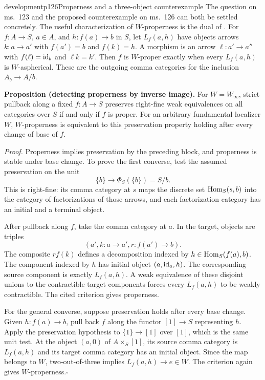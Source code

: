 \begin{dcomment}{development}{p126}{Properness and a three-object counterexample}
The question on ms.~123 and the proposed counterexample on ms.~126 can both be settled concretely. The useful characterization of $W$-properness is the dual of \citet[Theorem~1.2(b)]{Maltsiniotis2005Asphericite}. For $f:A\to S$, $a\in A$, and $h:f(a)\to b$ in $S$, let $L_f(a,h)$ have objects arrows $k:a\to a'$ with $f(a')=b$ and $f(k)=h$. A morphism is an arrow $\ell:a'\to a''$ with $f(\ell)=\mathrm{id}_b$ and $\ell k=k'$. Then $f$ is $W$-proper exactly when every $L_f(a,h)$ is $W$-aspherical. These are the outgoing comma categories for the inclusion $A_b\to A/b$.

\textbf{Proposition (detecting properness by inverse image).}\ours
For $W=W_\infty$, strict pullback along a fixed $f:A\to S$ preserves right-fine weak equivalences on all categories over $S$ if and only if $f$ is proper. For an arbitrary fundamental localizer $W$, $W$-properness is equivalent to this preservation property holding after every change of base of $f$.

\textit{Proof.} Properness implies preservation by the preceding block, and properness is stable under base change. To prove the first converse, test the assumed preservation on the unit
\[
 \{b\}\longrightarrow\Phi_S(\{b\})=S/b.
\]
This is right-fine: its comma category at $s$ maps the discrete set $\operatorname{Hom}_S(s,b)$ into the category of factorizations of those arrows, and each factorization category has an initial and a terminal object.

After pullback along $f$, take the comma category at $a$. In the target, objects are triples
\[
 (a',k:a\to a',r:f(a')\to b).
\]
The composite $r f(k)$ defines a decomposition indexed by $h\in\operatorname{Hom}_S(f(a),b)$. The component indexed by $h$ has initial object $(a,\mathrm{id}_a,h)$. The corresponding source component is exactly $L_f(a,h)$. A weak equivalence of these disjoint unions to the contractible target components forces every $L_f(a,h)$ to be weakly contractible. The cited criterion gives properness.

For the general converse, suppose preservation holds after every base change. Given $h:f(a)\to b$, pull back $f$ along the functor $[1]\to S$ representing $h$. Apply the preservation hypothesis to $\{1\}\to[1]$ over $[1]$, which is the same unit test. At the object $(a,0)$ of $A\times_S[1]$, its source comma category is $L_f(a,h)$ and its target comma category has an initial object. Since the map belongs to $W$, two-out-of-three implies $L_f(a,h)\to e\in W$. The criterion again gives $W$-properness.\hfill$\square$


\end{dcomment}
